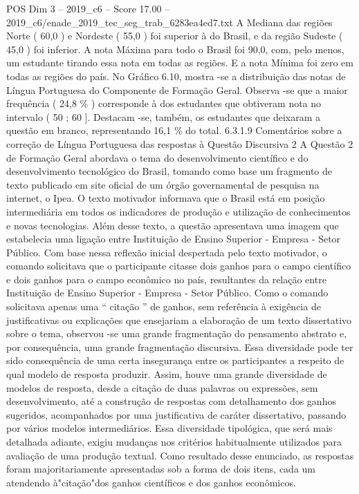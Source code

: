 \begin{textsample}{POS Dim 3 – 2019\_c6 – Score 17.00 – 2019\_c6/enade\_2019\_tec\_seg\_trab\_6283ea4ed7.txt}
A Mediana das regiões Norte ( 60,0 ) e Nordeste ( 55,0 ) foi superior à do Brasil, e da região Sudeste ( 45,0 ) foi inferior.
A nota Máxima para todo o Brasil foi 90,0, com, pelo menos, um estudante tirando essa nota em todas as regiões.
E a nota Mínima foi zero em todas as regiões do país.
No Gráfico 6.10, mostra -se a distribuição das notas de Língua Portuguesa do Componente de Formação Geral.
Observa -se que a maior frequência ( 24,8 \% ) corresponde à dos estudantes que obtiveram nota no intervalo ( 50 ; 60 ].
Destacam -se, também, os estudantes que deixaram a questão em branco, representando 16,1 \% do total. 6.3.1.9 Comentários sobre a correção de Língua Portuguesa das respostas à Questão Discursiva 2 A Questão 2 de Formação Geral abordava o tema do desenvolvimento científico e do desenvolvimento tecnológico do Brasil, tomando como base um fragmento de texto publicado em site oficial de um órgão governamental de pesquisa na internet, o Ipea.
O texto motivador informava que o Brasil está em posição intermediária em todos os indicadores de produção e utilização de conhecimentos e novas tecnologias.
Além desse texto, a questão apresentava uma imagem que estabelecia uma ligação entre Instituição de Ensino Superior - Empresa - Setor Público.
Com base nessa reflexão inicial despertada pelo texto motivador, o comando solicitava que o participante citasse dois ganhos para o campo científico e dois ganhos para o campo econômico no país, resultantes da relação entre Instituição de Ensino Superior - Empresa - Setor Público.
Como o comando solicitava apenas uma “ citação ” de ganhos, sem referência à exigência de justificativas ou explicações que ensejariam a elaboração de um texto dissertativo sobre o tema, observou -se uma grande fragmentação do pensamento abstrato e, por consequência, uma grande fragmentação discursiva.
Essa diversidade pode ter sido consequência de uma certa insegurança entre os participantes a respeito de qual modelo de resposta produzir.
Assim, houve uma grande diversidade de modelos de resposta, desde a citação de duas palavras ou expressões, sem desenvolvimento, até a construção de respostas com detalhamento dos ganhos sugeridos, acompanhados por uma justificativa de caráter dissertativo, passando por vários modelos intermediários.
Essa diversidade tipológica, que será mais detalhada adiante, exigiu mudanças nos critérios habitualmente utilizados para avaliação de uma produção textual.
Como resultado desse enunciado, as respostas foram majoritariamente apresentadas sob a forma de dois itens, cada um atendendo à"citação"dos ganhos científicos e dos ganhos econômicos.

\end{textsample}
